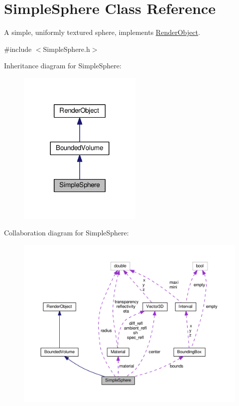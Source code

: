 \hypertarget{classSimpleSphere}{}\section{Simple\+Sphere Class Reference}
\label{classSimpleSphere}


A simple, uniformly textured sphere, implements \hyperlink{classRenderObject}{Render\+Object}.  




{\ttfamily \#include $<$Simple\+Sphere.\+h$>$}



Inheritance diagram for Simple\+Sphere\+:\nopagebreak
\begin{figure}[H]
\begin{center}
\leavevmode
\includegraphics[width=168pt]{classSimpleSphere__inherit__graph}
\end{center}
\end{figure}


Collaboration diagram for Simple\+Sphere\+:\nopagebreak
\begin{figure}[H]
\begin{center}
\leavevmode
\includegraphics[width=350pt]{classSimpleSphere__coll__graph}
\end{center}
\end{figure}
